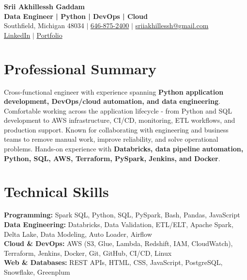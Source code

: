 \documentclass[letterpaper,10pt]{article}
\begin{document}
\fontsize{9.35pt}{10.45pt}\selectfont

\begin{center}
    {\LARGE \textbf{Srii Akhillessh Gaddam}} \\[-1pt]
    \textbf{Data Engineer | Python | DevOps | Cloud} \\[2pt]
    Southfield, Michigan 48034 $|$
    \href{tel:6468752400}{646-875-2400} $|$
    \href{mailto:sriiakhillessh@gmail.com}{sriiakhillessh@gmail.com} \\[1pt]
    \href{https://www.linkedin.com/in/srii-akhiilessh-gaddam-b48668191/}{LinkedIn} $|$
    \href{https://sriiakhillesshg.github.io/portfolio/}{Portfolio}
\end{center}
\vspace{-8pt}

\section{Professional Summary}
\small{Cross-functional engineer with experience spanning \textbf{Python application development, DevOps/cloud automation, and data engineering}. Comfortable working across the application lifecycle - from Python and SQL development to AWS infrastructure, CI/CD, monitoring, ETL workflows, and production support. Known for collaborating with engineering and business teams to remove manual work, improve reliability, and solve operational problems. Hands-on experience with \textbf{Databricks, data pipeline automation, Python, SQL, AWS, Terraform, PySpark, Jenkins, and Docker}.}

\section{Technical Skills}
\small{
\textbf{Programming:} Spark SQL, Python, SQL, PySpark, Bash, Pandas, JavaScript \\
\textbf{Data Engineering:} Databricks, Data Validation, ETL/ELT, Apache Spark, Delta Lake, Data Modeling, Auto Loader, Airflow \\
\textbf{Cloud \& DevOps:} AWS (S3, Glue, Lambda, Redshift, IAM, CloudWatch), Terraform, Jenkins, Docker, Git, GitHub, CI/CD, Linux \\
\textbf{Web \& Databases:} REST APIs, HTML, CSS, JavaScript, PostgreSQL, Snowflake, Greenplum
}

\end{document}
